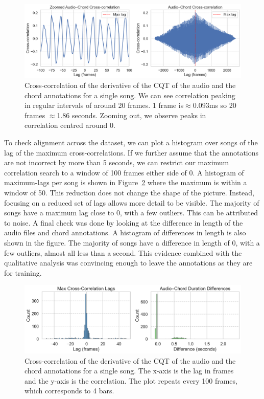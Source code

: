\begin{figure}[H]
    \centering
    \includegraphics[width=1.0\textwidth]{figures/cross_correlation.png}
    \caption{Cross-correlation of the derivative of the CQT of the audio and the chord annotations for a single song. We can see correlation peaking in regular intervals of around 20 frames. 1 frame is$\approx 0.093$ms so 20 frames $\approx$1.86 seconds. Zooming out, we observe peaks in correlation centred around 0.}\label{fig:cross-correlation}
\end{figure}

To check alignment across the dataset, we can plot a histogram over songs of the lag of the maximum cross-correlations. If we further assume that the annotations are not incorrect by more than 5 seconds, we can restrict our maximum correlation search to a window of 100 frames either side of 0. A histogram of maximum-lags per song is shown in Figure~\ref{fig:durations-and-lags} where the maximum is within a window of 50. This reduction does not change the shape of the picture. Instead, focusing on a reduced set of lags allows more detail to be visible. The majority of songs have a maximum lag close to 0, with a few outliers. This can be attributed to noise. A final check was done by looking at the difference in length of the audio files and chord annotations. A histogram of differences in length is also shown in the figure. The majority of songs have a difference in length of 0, with a few outliers, almost all less than a second. This evidence combined with the qualitative analysis was convincing enough to leave the annotations as they are for training.

\begin{figure}[H]
    \centering
    \includegraphics[width=1.0\textwidth]{figures/duration_diffs_and_lags.png}
    \caption{Cross-correlation of the derivative of the CQT of the audio and the chord annotations for a single song. The x-axis is the lag in frames and the y-axis is the correlation. The plot repeats every 100 frames, which corresponds to 4 bars.}\label{fig:durations-and-lags}
\end{figure}

